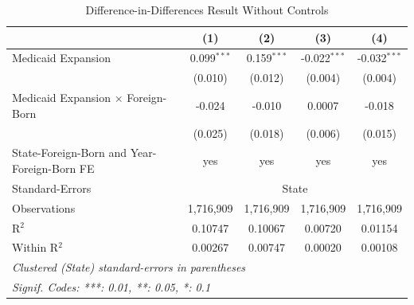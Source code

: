 
\begin{table}[htbp]
   \centering
   \begin{threeparttable}[b]
      \caption{Difference-in-Differences Result Without Controls}
      \begin{tabular}{lcccc}
         \tabularnewline \midrule \midrule
                                                     & (1)           & (2)           & (3)            & (4)\\  
         \midrule 
         Medicaid Expansion                          & 0.099$^{***}$ & 0.159$^{***}$ & -0.022$^{***}$ & -0.032$^{***}$\\   
                                                     & (0.010)       & (0.012)       & (0.004)        & (0.004)\\   
         Medicaid Expansion $\times$ Foreign-Born    & -0.024        & -0.010        & 0.0007         & -0.018\\   
                                                     & (0.025)       & (0.018)       & (0.006)        & (0.015)\\   
         \midrule 
         State-Foreign-Born and Year-Foreign-Born FE & yes           & yes           & yes            & yes\\  
         \midrule 
         Standard-Errors & \multicolumn{4}{c}{State} \\ 
         Observations                                & 1,716,909     & 1,716,909     & 1,716,909      & 1,716,909\\  
         R$^2$                                       & 0.10747       & 0.10067       & 0.00720        & 0.01154\\  
         Within R$^2$                                & 0.00267       & 0.00747       & 0.00020        & 0.00108\\  
         \midrule \midrule
         \multicolumn{5}{l}{\emph{Clustered (State) standard-errors in parentheses}}\\
         \multicolumn{5}{l}{\emph{Signif. Codes: ***: 0.01, **: 0.05, *: 0.1}}\\
      \end{tabular}
   \end{threeparttable}
\end{table}



